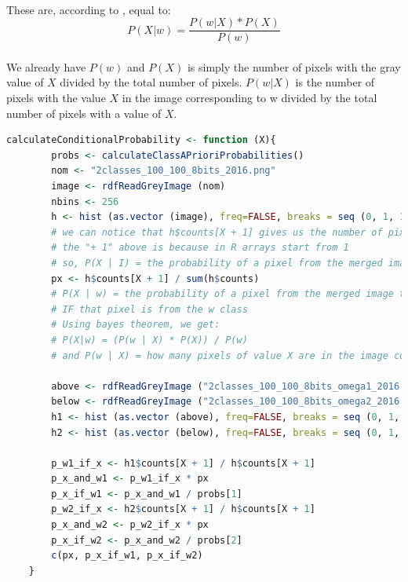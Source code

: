 \paragraph{}
These are, according to \cite{bayes_theorem}, equal to:
$$P(X|w) = \frac{P(w | X) * P(X)}{P(w)}$$

\paragraph{}
We already have $P(w)$ and $P(X)$ is simply the number of pixels with the gray value of $X$ divided by the total number of pixels.
$P(w | X)$ is the number of pixels with the value $X$ in the image corresponding to w divided by the total number of pixels with a value of $X$.

\begin{lstlisting}[language=R, caption=Calculating conditional probabilities]
    calculateConditionalProbability <- function (X){
        probs <- calculateClassAPrioriProbabilities()
        nom <- "2classes_100_100_8bits_2016.png"
        image <- rdfReadGreyImage (nom)
        nbins <- 256
        h <- hist (as.vector (image), freq=FALSE, breaks = seq (0, 1, 1 / nbins))
        # we can notice that h$counts[X + 1] gives us the number of pixels that have the gray value of X
        # the "+ 1" above is because in R arrays start from 1
        # so, P(X | I) = the probability of a pixel from the merged image to have the gray value of X
        px <- h$counts[X + 1] / sum(h$counts)
        # P(X | w) = the probability of a pixel from the merged image to have the gray value of X
        # IF that pixel is from the w class
        # Using bayes theorem, we get:
        # P(X|w) = (P(w | X) * P(X)) / P(w)
        # and P(w | X) = how many pixels of value X are in the image corresponding to w / the total number of pixels with a value of X
        
        above <- rdfReadGreyImage ("2classes_100_100_8bits_omega1_2016.png")
        below <- rdfReadGreyImage ("2classes_100_100_8bits_omega2_2016.png")
        h1 <- hist (as.vector (above), freq=FALSE, breaks = seq (0, 1, 1 / nbins))
        h2 <- hist (as.vector (below), freq=FALSE, breaks = seq (0, 1, 1 / nbins))
        
        p_w1_if_x <- h1$counts[X + 1] / h$counts[X + 1]
        p_x_and_w1 <- p_w1_if_x * px
        p_x_if_w1 <- p_x_and_w1 / probs[1]
        p_w2_if_x <- h2$counts[X + 1] / h$counts[X + 1]
        p_x_and_w2 <- p_w2_if_x * px
        p_x_if_w2 <- p_x_and_w2 / probs[2]
        c(px, p_x_if_w1, p_x_if_w2)
    }
\end{lstlisting}

